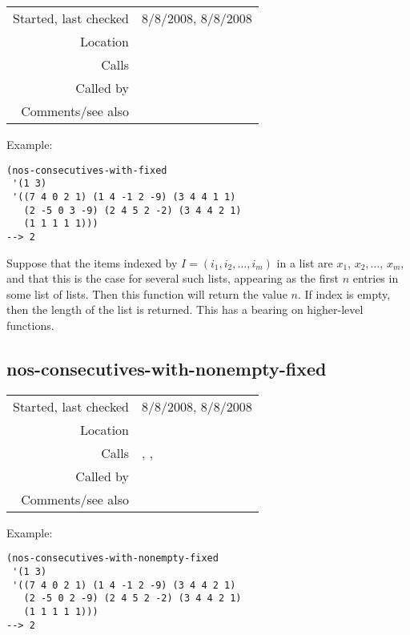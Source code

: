 \vspace{0.3cm}
\begin{tabular}{r|p{8cm}}
Started, last checked & 8/8/2008, 8/8/2008 \\
Location & \nameref{sec:sort-by} \\
Calls & \nameref{fun:nos-consecutives-with-nonempty-fixed} \\
Called by & \nameref{fun:rows-with-fixed-same-as-1st-row} \\
Comments/see also &
\end{tabular}

\vspace{0.5cm}
\noindent Example:
\begin{verbatim}
(nos-consecutives-with-fixed
 '(1 3)
 '((7 4 0 2 1) (1 4 -1 2 -9) (3 4 4 1 1)
   (2 -5 0 3 -9) (2 4 5 2 -2) (3 4 4 2 1)
   (1 1 1 1 1)))
--> 2
\end{verbatim}

\noindent Suppose that the items indexed by
$I = (i_1, i_2,\ldots, i_m)$ in a list are $x_1$,
$x_2,\ldots$, $x_m$, and that this is the case for
several such lists, appearing as the first $n$ entries
in some list of lists. Then this function will return
the value $n$. If index is empty, then the length of
the list is returned. This has a bearing on higher-level functions.


\subsection*{nos-consecutives-with-nonempty-fixed}\label{fun:nos-consecutives-with-nonempty-fixed}

\vspace{0.3cm}
\begin{tabular}{r|p{8cm}}
Started, last checked & 8/8/2008, 8/8/2008 \\
Location & \nameref{sec:sort-by} \\
Calls & \nameref{fun:firstn}, \nameref{fun:index-equalps-for-pair-list},\newline \nameref{fun:test-all-true} \\
Called by & \nameref{fun:nos-consecutives-with-fixed} \\
Comments/see also &
\end{tabular}

\vspace{0.5cm}
\noindent Example:
\begin{verbatim}
(nos-consecutives-with-nonempty-fixed
 '(1 3)
 '((7 4 0 2 1) (1 4 -1 2 -9) (3 4 4 2 1)
   (2 -5 0 2 -9) (2 4 5 2 -2) (3 4 4 2 1)
   (1 1 1 1 1)))
--> 2
\end{verbatim}

